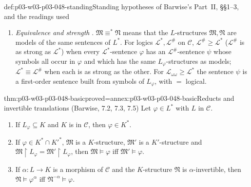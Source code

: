 \begin{hbconvention}{def:p03-w03-p03-048-standing}{Standing hypotheses of Barwise's Part~II, \S\S1--3, and the readings used}
\begin{enumerate}
      Barwise does for the sets \(I_\beta\) of his Theorem~10.5 (p.~245);
      with \(I=\emptyset\) the condition would hold between any two
      structures.  \(\mathfrak M\cong_{p}\mathfrak N\) means that some such
      \(I\) exists.
\item \emph{Equivalence and strength} \cite[Part~II, \S2, p.~254; \S3,
      3.1, p.~257]{Barwise1974Axioms}.  \(\mathfrak M\equiv^{\ast}\mathfrak N\)
      means that the \(L\)-structures \(\mathfrak M,\mathfrak N\) are models
      of the same sentences of \(L^{\ast}\).  For logics
      \(\mathcal L^{\ast},\mathcal L^{\#}\) on \(\mathcal C\),
      \(\mathcal L^{\#}\geq\mathcal L^{\ast}\) (\(\mathcal L^{\#}\) is as
      strong as \(\mathcal L^{\ast}\)) when every
      \(\mathcal L^{\ast}\)-sentence \(\varphi\) has an
      \(\mathcal L^{\#}\)-sentence \(\psi\) whose symbols all occur in
      \(\varphi\) and which has the same \(L_\varphi\)-structures as models;
      \(\mathcal L^{\ast}\equiv\mathcal L^{\#}\) when each is as strong as
      the other.  For \(\mathcal L_{\omega\omega}\geq\mathcal L^{\ast}\) the
      sentence \(\psi\) is a first-order sentence built from symbols of
      \(L_\varphi\), with \(=\) logical.
\end{enumerate}
\end{hbconvention}

\begin{hblemma}{thm:p03-w03-p03-048-basic}{proved=annex:p03-w03-p03-048-basic}{Reducts and invertible translations (Barwise, 7.2, 7.3, 7.5)}
Let \(\varphi\in L^{\ast}\) with \(L\) in \(\mathcal C\).
\begin{enumerate}
\item If \(L_\varphi\subseteq K\) and \(K\) is in \(\mathcal C\), then
      \(\varphi\in K^{\ast}\).
\item If \(\varphi\in K^{\ast}\cap K'^{\ast}\), \(\mathfrak M\) is a
      \(K\)-structure, \(\mathfrak M'\) is a \(K'\)-structure and
      \(\mathfrak M\restriction L_\varphi=\mathfrak M'\restriction L_\varphi\),
      then \(\mathfrak M\models\varphi\) iff \(\mathfrak M'\models\varphi\).
\item If \(\alpha:L\to K\) is a morphism of \(\mathcal C\) and the
      \(K\)-structure \(\mathfrak N\) is \(\alpha\)-invertible, then
      \(\mathfrak N\models\varphi^{\alpha}\) iff
      \(\mathfrak N^{-\alpha}\models\varphi\).
\end{enumerate}
\end{hblemma}

